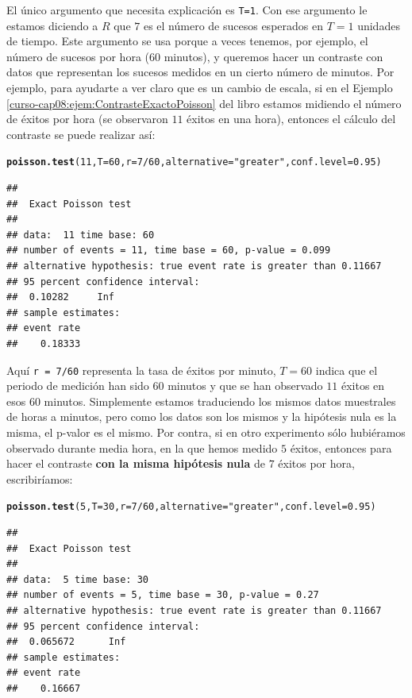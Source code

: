 \documentclass[10pt,a4paper]{article}\usepackage[]{graphicx}\usepackage[]{color}
\makeatletter
\newcommand{\hlnum}[1]{\textcolor[rgb]{0.686,0.059,0.569}{#1}}%
\newcommand{\hlstr}[1]{\textcolor[rgb]{0.192,0.494,0.8}{#1}}%
\newcommand{\hlopt}[1]{\textcolor[rgb]{0,0,0}{#1}}%
\newcommand{\hlstd}[1]{\textcolor[rgb]{0.345,0.345,0.345}{#1}}%
\newcommand{\hlkwc}[1]{\textcolor[rgb]{0.333,0.667,0.333}{#1}}%
\newcommand{\hlkwd}[1]{\textcolor[rgb]{0.737,0.353,0.396}{\textbf{#1}}}%
\newenvironment{kframe}{%
 \def\at@end@of@kframe{}%
 \ifinner\ifhmode%
  \def\at@end@of@kframe{\end{minipage}}%
  \begin{minipage}{\columnwidth}%
 \fi\fi%
 \def\FrameCommand##1{\hskip\@totalleftmargin \hskip-\fboxsep
 \colorbox{shadecolor}{##1}\hskip-\fboxsep
     \hskip-\linewidth \hskip-\@totalleftmargin \hskip\columnwidth}%
 \MakeFramed {\advance\hsize-\width
   \@totalleftmargin\z@ \linewidth\hsize
   \@setminipage}}%
 {\par\unskip\endMakeFramed%
 \at@end@of@kframe}
\newenvironment{knitrout}{}{} %
\newcounter {cont01}
\makeatother
\begin{document}
El único argumento que necesita explicación es {\tt T=1}. Con ese argumento le estamos diciendo a $R$ que $7$ es el número de sucesos esperados en $T=1$ unidades de tiempo.  Este argumento se usa porque a veces tenemos, por ejemplo, el número de sucesos por hora ($60$ minutos), y queremos hacer un contraste con datos que representan los sucesos medidos en un cierto número de minutos. Por ejemplo, para ayudarte a ver claro que es un cambio de escala, si en el Ejemplo \ref{curso-cap08:ejem:ContrasteExactoPoisson} del libro estamos midiendo el número de éxitos por hora (se observaron $11$ éxitos en una hora), entonces el cálculo del contraste se puede realizar así:
\begin{knitrout}
\color{fgcolor}\begin{kframe}
\begin{alltt}
\hlkwd{poisson.test}\hlstd{(}\hlnum{11}\hlstd{,} \hlkwc{T}\hlstd{=}\hlnum{60}\hlstd{,} \hlkwc{r}\hlstd{=}\hlnum{7}\hlopt{/}\hlnum{60}\hlstd{,} \hlkwc{alternative}\hlstd{=}\hlstr{"greater"}\hlstd{,} \hlkwc{conf.level}\hlstd{=}\hlnum{0.95}\hlstd{)}
\end{alltt}
\begin{verbatim}
## 
## 	Exact Poisson test
## 
## data:  11 time base: 60
## number of events = 11, time base = 60, p-value = 0.099
## alternative hypothesis: true event rate is greater than 0.11667
## 95 percent confidence interval:
##  0.10282     Inf
## sample estimates:
## event rate 
##    0.18333
\end{verbatim}
\end{kframe}
\end{knitrout}
Aquí {\tt r = 7/60} representa la tasa de éxitos por minuto, $T=60$ indica que el periodo de medición han sido $60$ minutos y que se han observado $11$ éxitos en esos $60$ minutos. Simplemente estamos traduciendo los mismos datos muestrales de horas a minutos, pero como los datos son los mismos y la hipótesis nula es la misma, el p-valor es el mismo. Por contra, si en otro experimento sólo hubiéramos observado durante media hora, en la que hemos medido $5$ éxitos, entonces para hacer el contraste {\bf con la misma hipótesis nula} de $7$ éxitos por hora, escribiríamos:
\begin{knitrout}
\color{fgcolor}\begin{kframe}
\begin{alltt}
\hlkwd{poisson.test}\hlstd{(}\hlnum{5}\hlstd{,} \hlkwc{T}\hlstd{=}\hlnum{30}\hlstd{,} \hlkwc{r}\hlstd{=}\hlnum{7}\hlopt{/}\hlnum{60}\hlstd{,} \hlkwc{alternative}\hlstd{=}\hlstr{"greater"}\hlstd{,} \hlkwc{conf.level}\hlstd{=}\hlnum{0.95}\hlstd{)}
\end{alltt}
\begin{verbatim}
## 
## 	Exact Poisson test
## 
## data:  5 time base: 30
## number of events = 5, time base = 30, p-value = 0.27
## alternative hypothesis: true event rate is greater than 0.11667
## 95 percent confidence interval:
##  0.065672      Inf
## sample estimates:
## event rate 
##    0.16667
\end{verbatim}
\end{kframe}
\end{knitrout}
\end{document}
